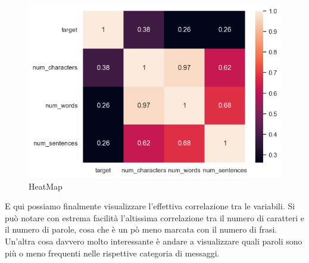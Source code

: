 \documentclass[]{article}
\begin{document}
     \begin{figure}[H]
            \centering
            \includegraphics[width=1\linewidth]{images/matrice_corr.png}
            \caption{HeatMap}
            \label{fig:enter-label}
    \end{figure}

    E qui possiamo finalmente visualizzare l'effettiva correlazione tra le variabili. Si può notare con estrema facilità l'altissima correlazione tra il numero di caratteri e il numero di parole, cosa che è un pò meno marcata con il numero di frasi.\\
   Un'altra cosa davvero molto interessante è andare a visualizzare quali paroli sono più o meno frequenti nelle rispettive categoria di messaggi.
\end{document}

